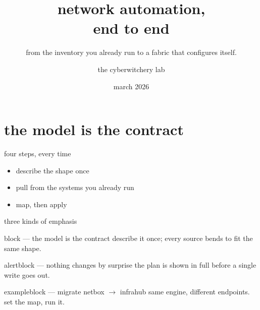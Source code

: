 \documentclass[aspectratio=169,11pt]{beamer}
\title{network automation,\\end to end}
\subtitle{from the inventory you already run to a fabric that configures itself.}
\author{the cyberwitchery lab}
\institute{cyberwitchery gmbh}
\date{march 2026}
\begin{document}
{
\begin{frame}[plain]
  \cwlogoright[cwGhost]{0.46\paperheight}%
  \titlepage
\end{frame}}

\section{the model is the contract}

\begin{frame}{four steps, every time}
  \begin{itemize}\setlength\itemsep{1.1em}
    \item describe the shape once\\[2pt]
      {}
    \item pull from the systems you already run\\[2pt]
      {}
    \item map, then apply\\[2pt]
      {}
  \end{itemize}
\end{frame}

\begin{frame}{three kinds of emphasis}
  \begin{block}{block --- the model is the contract}
    describe it once; every source bends to fit the same shape.
  \end{block}
  \begin{alertblock}{alertblock --- nothing changes by surprise}
    the plan is shown in full before a single write goes out.
  \end{alertblock}
  \begin{exampleblock}{exampleblock --- migrate netbox $\rightarrow$ infrahub}
    same engine, different endpoints. set the map, run it.
  \end{exampleblock}
\end{frame}
\end{document}
